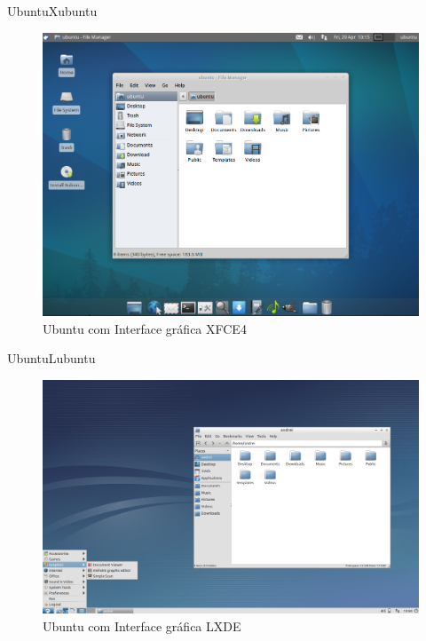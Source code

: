 \documentclass{beamer}
\begin{document}
\begin{frame}{Ubuntu}{Xubuntu}
 \begin{figure}[h!]
        \centering
        \includegraphics[scale=0.20]{Xubuntu.png}
        \caption{Ubuntu com Interface gráfica XFCE4}
        \label{fig:Comando ls}
    \end{figure}
\end{frame}

\begin{frame}{Ubuntu}{Lubuntu}
 \begin{figure}[h!]
        \centering
        \includegraphics[scale=0.16]{lubuntu.png}
        \caption{Ubuntu com Interface gráfica LXDE}
        \label{fig:Comando ls}
    \end{figure}
\end{frame}
\end{document}
